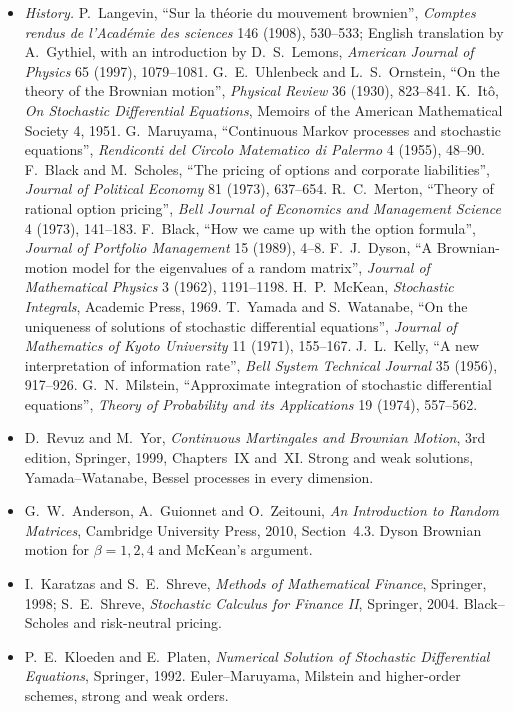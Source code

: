 \begin{itemize}
\item \emph{History.} P.~Langevin, ``Sur la th\'eorie du mouvement brownien'', \emph{Comptes rendus de l'Acad\'emie des sciences} 146 (1908), 530--533; English translation by A.~Gythiel, with an introduction by D.~S.~Lemons,
\emph{American Journal of Physics} 65 (1997), 1079--1081. G.~E.~Uhlenbeck and L.~S.~Ornstein, ``On the theory of the Brownian motion'', \emph{Physical Review} 36 (1930), 823--841. K.~It\^o, \emph{On Stochastic Differential
Equations}, Memoirs of the American Mathematical Society 4, 1951. G.~Maruyama, ``Continuous Markov processes and stochastic equations'', \emph{Rendiconti del Circolo Matematico di Palermo} 4 (1955), 48--90.
F.~Black and M.~Scholes, ``The pricing of options and corporate liabilities'', \emph{Journal of Political Economy} 81 (1973), 637--654. R.~C.~Merton, ``Theory of rational option pricing'', \emph{Bell Journal of
Economics and Management Science} 4 (1973), 141--183. F.~Black, ``How we came up with the option formula'', \emph{Journal of Portfolio Management} 15 (1989), 4--8. F.~J.~Dyson, ``A Brownian-motion model for the
eigenvalues of a random matrix'', \emph{Journal of Mathematical Physics} 3 (1962), 1191--1198. H.~P.~McKean, \emph{Stochastic Integrals}, Academic Press, 1969. T.~Yamada and S.~Watanabe, ``On the uniqueness of
solutions of stochastic differential equations'', \emph{Journal of Mathematics of Kyoto University} 11 (1971), 155--167. J.~L.~Kelly, ``A new interpretation of information rate'', \emph{Bell System Technical Journal} 35 (1956), 917--926. G.~N.~Milstein, ``Approximate integration of stochastic differential equations'', \emph{Theory of
Probability and its Applications} 19 (1974), 557--562.
\item D.~Revuz and M.~Yor, \emph{Continuous Martingales and Brownian Motion}, 3rd edition, Springer, 1999, Chapters~IX and~XI. Strong and weak solutions, Yamada--Watanabe, Bessel processes in every dimension.
\item G.~W.~Anderson, A.~Guionnet and O.~Zeitouni, \emph{An Introduction to Random Matrices}, Cambridge University Press, 2010, Section~4.3. Dyson Brownian motion for $\beta=1,2,4$ and McKean's argument.
\item I.~Karatzas and S.~E.~Shreve, \emph{Methods of Mathematical Finance}, Springer, 1998; S.~E.~Shreve, \emph{Stochastic Calculus for Finance II}, Springer, 2004. Black--Scholes and risk-neutral pricing.
\item P.~E.~Kloeden and E.~Platen, \emph{Numerical Solution of Stochastic Differential Equations}, Springer, 1992. Euler--Maruyama, Milstein and higher-order schemes, strong and weak orders.
\end{itemize}
